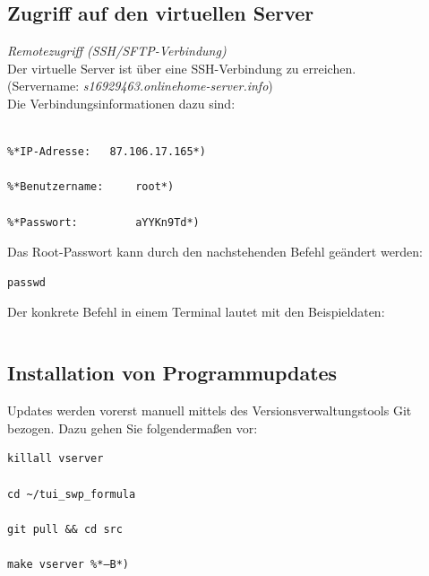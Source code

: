 \documentclass[fontsize = 12pt, paper = a4]{scrreprt}
\begin{document}
\subsection{Zugriff auf den virtuellen Server}		

\textit{Remotezugriff (SSH/SFTP-Verbindung)} \\

Der virtuelle Server ist über eine SSH-Verbindung zu erreichen. \\
(Servername: \textit{s16929463.onlinehome-server.info}) \\
Die Verbindungsinformationen dazu sind:

\vspace*{4mm}
\begin{lstlisting}[frame=single]
%*Port:  		22*)

%*IP-Adresse: 	87.106.17.165*) 

%*Benutzername:		root*)

%*Passwort:			aYYKn9Td*)
\end{lstlisting} 
\vspace*{-2mm}

Das Root-Passwort kann durch den nachstehenden Befehl geändert werden:

\vspace*{4mm}
\begin{lstlisting}[frame=single]
passwd
\end{lstlisting} 
\vspace*{-2mm}

\newpage

Der konkrete Befehl in einem Terminal lautet mit den Beispieldaten:	

\vspace*{4mm}
\begin{lstlisting}[frame=single]
%*ssh root@87.106.17.165  –p22*)
\end{lstlisting} 
\vspace*{-2mm}

\subsection{Installation von Programmupdates}

Updates werden vorerst manuell mittels des Versionsverwaltungstools Git bezogen. Dazu gehen Sie folgendermaßen vor:

\vspace*{4mm}
\begin{lstlisting}[frame=single]
killall vserver

cd ~/tui_swp_formula

git pull && cd src

make vserver %*–B*)
\end{lstlisting} 
\vspace*{-2mm}
%
\end{document}
